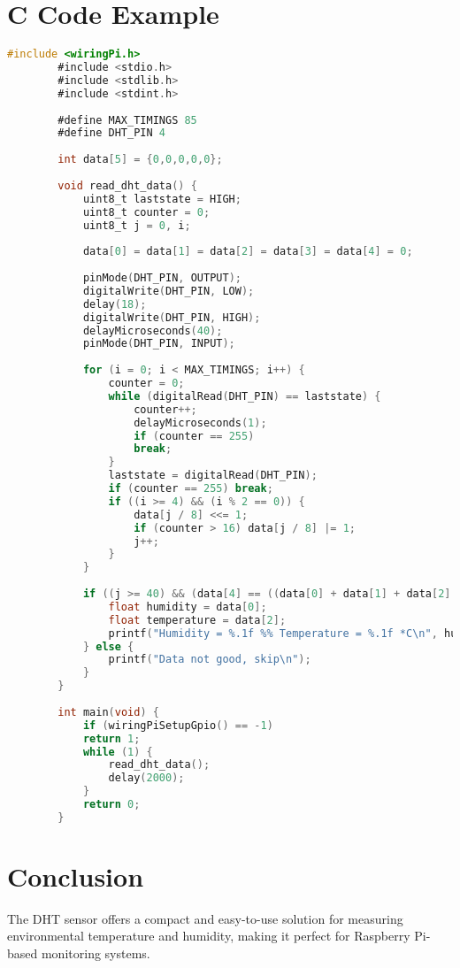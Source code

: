 \documentclass{article}
\begin{document}
	\section{C Code Example}
	\begin{lstlisting}[language=C]
		#include <wiringPi.h>
		#include <stdio.h>
		#include <stdlib.h>
		#include <stdint.h>
		
		#define MAX_TIMINGS 85
		#define DHT_PIN 4
		
		int data[5] = {0,0,0,0,0};
		
		void read_dht_data() {
			uint8_t laststate = HIGH;
			uint8_t counter = 0;
			uint8_t j = 0, i;
			
			data[0] = data[1] = data[2] = data[3] = data[4] = 0;
			
			pinMode(DHT_PIN, OUTPUT);
			digitalWrite(DHT_PIN, LOW);
			delay(18);
			digitalWrite(DHT_PIN, HIGH);
			delayMicroseconds(40);
			pinMode(DHT_PIN, INPUT);
			
			for (i = 0; i < MAX_TIMINGS; i++) {
				counter = 0;
				while (digitalRead(DHT_PIN) == laststate) {
					counter++;
					delayMicroseconds(1);
					if (counter == 255)
					break;
				}
				laststate = digitalRead(DHT_PIN);
				if (counter == 255) break;
				if ((i >= 4) && (i % 2 == 0)) {
					data[j / 8] <<= 1;
					if (counter > 16) data[j / 8] |= 1;
					j++;
				}
			}
			
			if ((j >= 40) && (data[4] == ((data[0] + data[1] + data[2] + data[3]) & 0xFF))) {
				float humidity = data[0];
				float temperature = data[2];
				printf("Humidity = %.1f %% Temperature = %.1f *C\n", humidity, temperature);
			} else {
				printf("Data not good, skip\n");
			}
		}
		
		int main(void) {
			if (wiringPiSetupGpio() == -1)
			return 1;
			while (1) {
				read_dht_data();
				delay(2000);
			}
			return 0;
		}
	\end{lstlisting}
	
	\section{Conclusion}
	The DHT sensor offers a compact and easy-to-use solution for measuring environmental temperature and humidity, making it perfect for Raspberry Pi-based monitoring systems.
	
\end{document}

